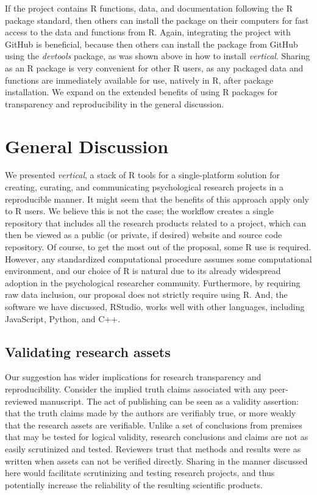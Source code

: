 \documentclass[
  english,
  jou,floatsintext]{apa6}
\begin{document}
If the project contains R functions, data, and documentation following the R package standard, then others can install the package on their computers for fast access to the data and functions from R. Again, integrating the project with GitHub is beneficial, because then others can install the package from GitHub using the \emph{devtools} package, as was shown above in how to install \emph{vertical}. Sharing as an R package is very convenient for other R users, as any packaged data and functions are immediately available for use, natively in R, after package installation. We expand on the extended benefits of using R packages for transparency and reproducibility in the general discussion.

\hypertarget{general-discussion}{%
\section{General Discussion}\label{general-discussion}}

We presented \emph{vertical}, a stack of R tools for a single-platform solution for creating, curating, and communicating psychological research projects in a reproducible manner. It might seem that the benefits of this approach apply only to R users. We believe this is not the case; the workflow creates a single repository that includes all the research products related to a project, which can then be viewed as a public (or private, if desired) website and source code repository. Of course, to get the most out of the proposal, some R use is required. However, any standardized computational procedure assumes some computational environment, and our choice of R is natural due to its already widespread adoption in the psychological researcher community. Furthermore, by requiring raw data inclusion, our proposal does not strictly require using R. And, the software we have discussed, RStudio, works well with other languages, including JavaScript, Python, and C++.

\hypertarget{validating-research-assets}{%
\subsection{Validating research assets}\label{validating-research-assets}}

Our suggestion has wider implications for research transparency and reproducibility. Consider the implied truth claims associated with any peer-reviewed manuscript. The act of publishing can be seen as a validity assertion: that the truth claims made by the authors are verifiably true, or more weakly that the research assets are verifiable. Unlike a set of conclusions from premises that may be tested for logical validity, research conclusions and claims are not as easily scrutinized and tested. Reviewers trust that methods and results were as written when assets can not be verified directly. Sharing in the manner discussed here would facilitate scrutinizing and testing research projects, and thus potentially increase the reliability of the resulting scientific products.
\end{document}
